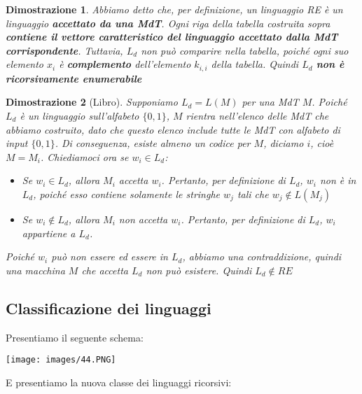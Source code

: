 \documentclass[12pt]{article}
\newtheorem{Dimostrazione}{Dimostrazione}[subsection]
\begin{document}
\begin{Dimostrazione}
    Abbiamo detto che, per definizione, un linguaggio RE è un linguaggio \textbf{accettato da una MdT}. Ogni riga della tabella costruita sopra \textbf{contiene il vettore caratteristico del linguaggio accettato dalla MdT corrispondente}. Tuttavia, $L_d$ non può comparire nella tabella, poiché ogni suo elemento $x_i$ è \textbf{complemento} dell'elemento $k_{i, i}$ della tabella. Quindi $L_d$ \textbf{non è ricorsivamente enumerabile}
\end{Dimostrazione}
\begin{Dimostrazione}[Libro]
    Supponiamo $L_d = L(M)$ per una MdT $M$. Poiché $L_d$ è un linguaggio sull'alfabeto $\{0, 1\}$, $M$ rientra nell'elenco delle MdT che abbiamo costruito, dato che questo elenco include tutte le MdT con alfabeto di input $\{0, 1\}$. Di conseguenza, esiste almeno un codice per $M$, diciamo $i$, cioè $M = M_i$. Chiediamoci ora se $w_i \in L_d$:
    \begin{itemize}
        \item Se $w_i \in L_d$, allora $M_i$ accetta $w_i$. Pertanto, per definizione di $L_d$, $w_i$ non è in $L_d$, poiché esso contiene solamente le stringhe $w_j$ tali che $w_j \not\in L(M_j)$
        \item Se $w_i \not\in L_d$, allora $M_i$ non accetta $w_i$. Pertanto, per definizione di $L_d$, $w_i$ appartiene a $L_d$.
    \end{itemize}
    Poiché $w_i$ può non essere ed essere in $L_d$, abbiamo una contraddizione, quindi una macchina $M$ che accetta $L_d$ non può esistere. Quindi $L_d \not\in RE$
\end{Dimostrazione}
\subsection{Classificazione dei linguaggi}
Presentiamo il seguente schema:
\begin{center}
    \texttt{[image: images/44.PNG]}
\end{center}
E presentiamo la nuova classe dei linguaggi ricorsivi:
\end{document}
